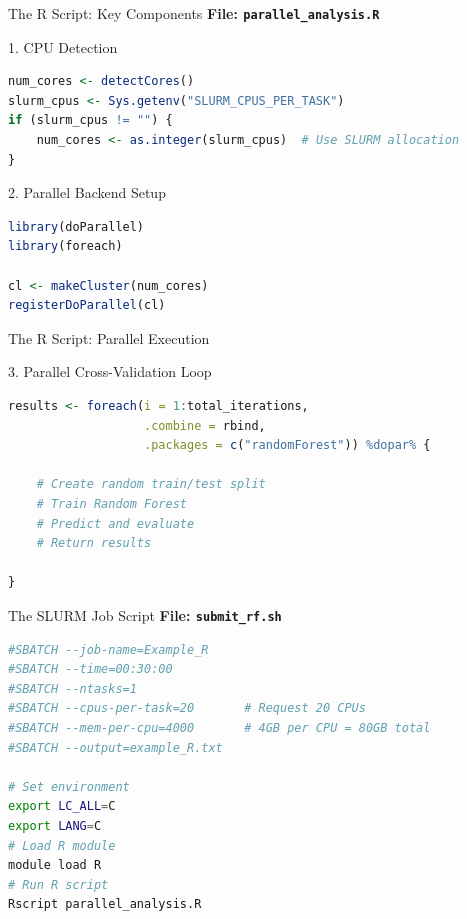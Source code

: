 \documentclass[aspectratio=169]{beamer}
\begin{document}
\begin{frame}[fragile]{The R Script: Key Components}
\textbf{File: \texttt{parallel\_analysis.R}}

\begin{block}{1. CPU Detection}
\begin{lstlisting}[language=R, basicstyle=\ttfamily\scriptsize]
num_cores <- detectCores()
slurm_cpus <- Sys.getenv("SLURM_CPUS_PER_TASK")
if (slurm_cpus != "") {
    num_cores <- as.integer(slurm_cpus)  # Use SLURM allocation
}
\end{lstlisting}
\end{block}

\begin{block}{2. Parallel Backend Setup}
\begin{lstlisting}[language=R, basicstyle=\ttfamily\scriptsize]
library(doParallel)
library(foreach)

cl <- makeCluster(num_cores)
registerDoParallel(cl)
\end{lstlisting}
\end{block}
\end{frame}

\begin{frame}[fragile]{The R Script: Parallel Execution}
\begin{block}{3. Parallel Cross-Validation Loop}
\begin{lstlisting}[language=R, basicstyle=\ttfamily]
results <- foreach(i = 1:total_iterations,
                   .combine = rbind,
                   .packages = c("randomForest")) %dopar% {
    
    # Create random train/test split
    # Train Random Forest
    # Predict and evaluate
    # Return results

}
\end{lstlisting}
\end{block}

\end{frame}

\begin{frame}[fragile]{The SLURM Job Script}
\textbf{File: \texttt{submit\_rf.sh}}

\begin{lstlisting}[language=bash]
#SBATCH --job-name=Example_R
#SBATCH --time=00:30:00
#SBATCH --ntasks=1
#SBATCH --cpus-per-task=20       # Request 20 CPUs
#SBATCH --mem-per-cpu=4000       # 4GB per CPU = 80GB total
#SBATCH --output=example_R.txt

# Set environment
export LC_ALL=C
export LANG=C
# Load R module
module load R
# Run R script
Rscript parallel_analysis.R
\end{lstlisting}

\end{frame}
\end{document}
